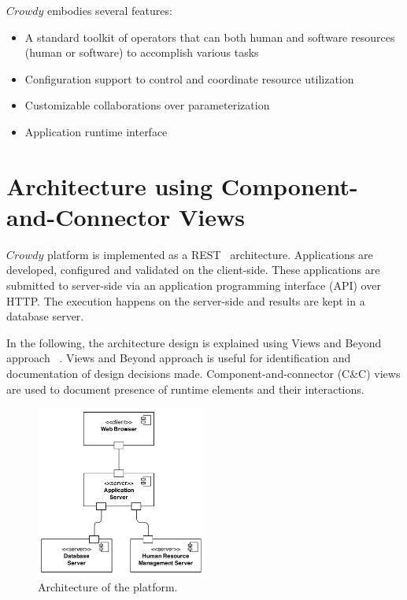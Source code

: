 $Crowdy$ embodies several features:
\begin{itemize}
	\item A standard toolkit of operators that can both human and software resources 
	(human or software) to accomplish various tasks
	\item Configuration support to control and coordinate resource utilization 
	\item Customizable collaborations over parameterization
	\item Application runtime interface
\end{itemize}

\section{Architecture using Component-and-Connector Views}


$Crowdy$ platform is implemented as a REST~\cite{Richardson2008} architecture. 
Applications are developed, configured and validated on the client-side. These 
applications are submitted to server-side via an application programming interface 
(API) over HTTP. The execution happens on the server-side and results are kept 
in a database server.

In the following, the architecture design is explained using Views and Beyond approach
~\cite{Clements}. Views and Beyond approach is useful for identification and documentation of 
design decisions made. Component-and-connector (C\&C) views are used to document 
presence of runtime elements and their interactions.

\begin{figure}[ht]
	\centering
	\includegraphics[width=0.5\textwidth]{figures/architecture/CC1.png}
	\caption{Architecture of the platform.}
	\label{fig:arch}
\end{figure}


